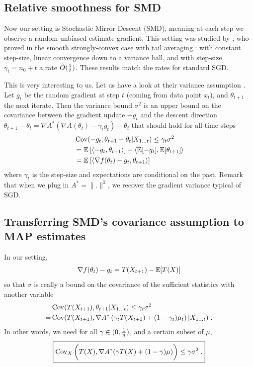 \documentclass{article}
\newcommand*{\expect}[2][]{\ensuremath{\mathbb{E}_{#1} \left[ #2 \right] }} %
\newcommand{\logpart}{A}
\newcommand{\conj}{\logpart^*}
\newcommand{\natp}{\theta}
\newcommand{\lr}{\gamma} %
\begin{document}
\subsection{Relative smoothness for SMD}
Now our setting is Stochastic Mirror Descent (SMD), meaning at each step we observe a random unbiased estimate gradient. This setting was studied by \citet{hanzely2018fastest}, who proved in the smooth strongly-convex case with tail averaging :  with constant step-size, linear convergence down to a variance ball, and with step-size $\gamma_t = n_0 + t$ a rate $\tilde O(\frac{1}{t})$. These results match the rates for standard SGD.

This is very interesting to us.
Let us have a look at their variance assumption \citep[Assumption 5.1]{hanzely2018fastest}.
Let $g_t$ be the random gradient at step $t$  (coming from data point $x_t$), and $\natp_{t+1}$ the next iterate. Then the variance bound $\sigma^2$ is an upper bound on the covariance between the gradient update  $-g_t$ and the descent direction $\natp_{t+1} - \natp_t = \nabla \logpart^*(\nabla \logpart(\natp_t) - \lr_t g_t ) - \natp_t $ that should hold for all time steps  
\begin{align}
	&\Cov(- g_t,\natp_{t+1} - \natp_t | X_{1 \dots t}) \leq \lr_t \sigma^2 \\
	&= \expect{\langle - g_t, \natp_{t+1} \rangle}  - \langle \E[-g_t], \E[\natp_{t+1}] \rangle   \\
	 &= \expect{\langle \nabla f(\natp_t) - g_t , \natp_{t+1}  \rangle}
\end{align}
where $\gamma_t$ is the step-size and expectations are conditional on the past. Remark that when we plug in $\conj = \|.\|^2$, we recover the gradient variance typical of SGD. 

\subsection{Transferring SMD's covariance assumption to MAP estimates}
In our setting, 
\begin{align}
	\nabla f(\natp_t) - g_t =  T(X_{t+1})	- \E[T(X)]
\end{align}
so that $\sigma$ is really a bound on the covariance of the sufficient statistics with another variable
\begin{align}
	&\Cov( T(X_{t+1}), \natp_{t+1}| X_{1\dots t})
	\leq \lr_t\sigma^2 \\
	=& \Cov(T(X_{t+1}), \nabla\conj \left(\lr_t T(X_{t+1}) + (1-\lr_t ) \mu_t \right) | X_{1\dots t}) \;.
\end{align}
In other words, we need for all $\lr\in(0,\inv{n})$, and a certain subset of $\mu$,
\begin{align}
\label{eq:hypvariance}
	\boxed{
	\Cov_X \bigg(T(X), \nabla \conj (\lr T(X) + (1-\lr) \mu)\bigg	) 
	\leq \lr \sigma^2 \; .
	}
\end{align}
\end{document}
